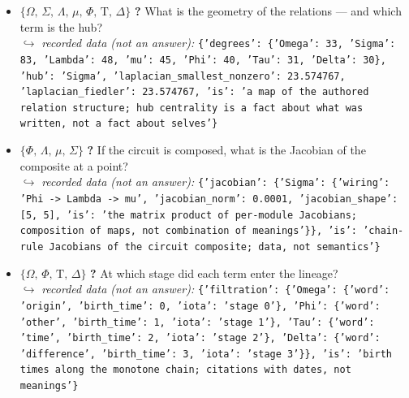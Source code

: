 \documentclass[11pt]{article}
\newcommand{\Tau}{\mathrm{T}}
\begin{document}
\begin{itemize}
\item $\{\Omega,\,\Sigma,\,\Lambda,\,\mu,\,\Phi,\,\Tau,\,\Delta\}$ \quad \textbf{?} What is the geometry of the relations — and which term is the hub? \\ \hspace*{1em}$\hookrightarrow$ \emph{recorded data (not an answer):} \texttt{\{'degrees': \{'Omega': 33, 'Sigma': 83, 'Lambda': 48, 'mu': 45, 'Phi': 40, 'Tau': 31, 'Delta': 30\}, 'hub': 'Sigma', 'laplacian\_smallest\_nonzero': 23.574767, 'laplacian\_fiedler': 23.574767, 'is': 'a map of the authored relation structure; hub centrality is a fact about what was written, not a fact about selves'\}}
\item $\{\Phi,\,\Lambda,\,\mu,\,\Sigma\}$ \quad \textbf{?} If the circuit is composed, what is the Jacobian of the composite at a point? \\ \hspace*{1em}$\hookrightarrow$ \emph{recorded data (not an answer):} \texttt{\{'jacobian': \{'Sigma': \{'wiring': 'Phi -> Lambda -> mu', 'jacobian\_norm': 0.0001, 'jacobian\_shape': [5, 5], 'is': 'the matrix product of per-module Jacobians; composition of maps, not combination of meanings'\}\}, 'is': 'chain-rule Jacobians of the circuit composite; data, not semantics'\}}
\item $\{\Omega,\,\Phi,\,\Tau,\,\Delta\}$ \quad \textbf{?} At which stage did each term enter the lineage? \\ \hspace*{1em}$\hookrightarrow$ \emph{recorded data (not an answer):} \texttt{\{'filtration': \{'Omega': \{'word': 'origin', 'birth\_time': 0, 'iota': 'stage 0'\}, 'Phi': \{'word': 'other', 'birth\_time': 1, 'iota': 'stage 1'\}, 'Tau': \{'word': 'time', 'birth\_time': 2, 'iota': 'stage 2'\}, 'Delta': \{'word': 'difference', 'birth\_time': 3, 'iota': 'stage 3'\}\}, 'is': 'birth times along the monotone chain; citations with dates, not meanings'\}}\end{itemize}
\end{document}
